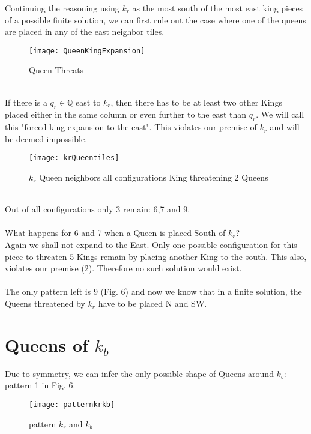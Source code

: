 \documentclass[a4paper,oneside]{scrarticle}
\begin{document}
	Continuing the reasoning using $k_r$ as the most south of the most east king pieces of a possible finite solution, we can first rule out the case where one of the queens are placed in any of the east neighbor tiles.\\
	\begin{figure*}[h]
		\centering
		\texttt{[image: QueenKingExpansion]}
		\caption{Queen Threats}
		\label{fig:queenkingexpansion}
	\end{figure*}\\
	If there is a $q_r\in\mathbb{Q}$ east to $k_r$, then there has to be at least two other Kings placed either in the same column or even further to the east than $q_r$. We will call this "forced king expansion to the east". This violates our premise of $k_r$ and will be deemed impossible.
	\\
	\begin{figure*}[h]
		\centering
		\texttt{[image: krQueentiles]}
		\caption{$k_r$ Queen neighbors all configurations King threatening 2 Queens}
		\label{fig:krqueentiles}
	\end{figure*}\\
	Out of all configurations only 3 remain: 6,7 and 9.\\
	\\
	What happens for 6 and 7 when a Queen is placed South of $k_r$?\\
	Again we shall not expand to the East. Only one possible configuration for this piece to threaten 5 Kings remain by placing another King to the south. This also, violates our premise (2). Therefore no such solution would exist.\\
	\\
	The only pattern left is 9 (Fig. 6) and now we know that in a finite solution, the Queens threatened by $k_r$ have to be placed N and SW.
	
	\section{Queens of $k_b$}
	Due to symmetry, we can infer the only possible shape of Queens around $k_b:$ pattern 1 in Fig. 6.\\
	\begin{figure}[h]
		\centering
		\texttt{[image: patternkrkb]}
		\caption{pattern $k_r$ and $k_b$}
		\label{fig:patternkrkb}
	\end{figure}
	
\end{document}
